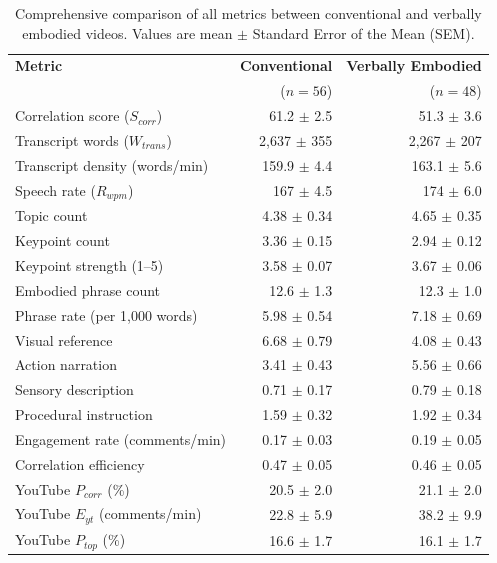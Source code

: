 \documentclass[fleqn,10pt]{JLA_article} %
\begin{document}
\begin{table}[h!]
    \centering
    \caption{Comprehensive comparison of all metrics between conventional and verbally embodied videos. Values are mean $\pm$ Standard Error of the Mean (SEM).}
    \begin{tabular}{l r r}
        \toprule
        \textbf{Metric} & \textbf{Conventional} & \textbf{Verbally Embodied} \\
        & ($n = 56$) & ($n = 48$) \\
        \midrule
        Correlation score ($S_{corr}$) & 61.2 $\pm$ 2.5 & 51.3 $\pm$ 3.6 \\
        Transcript words ($W_{trans}$) & 2{,}637 $\pm$ 355 & 2{,}267 $\pm$ 207 \\
        Transcript density (words/min) & 159.9 $\pm$ 4.4 & 163.1 $\pm$ 5.6 \\
        Speech rate ($R_{wpm}$) & 167 $\pm$ 4.5 & 174 $\pm$ 6.0 \\
        Topic count & 4.38 $\pm$ 0.34 & 4.65 $\pm$ 0.35 \\
        Keypoint count & 3.36 $\pm$ 0.15 & 2.94 $\pm$ 0.12 \\
        Keypoint strength (1--5) & 3.58 $\pm$ 0.07 & 3.67 $\pm$ 0.06 \\
        Embodied phrase count & 12.6 $\pm$ 1.3 & 12.3 $\pm$ 1.0 \\
        Phrase rate (per 1{,}000 words) & 5.98 $\pm$ 0.54 & 7.18 $\pm$ 0.69 \\
        Visual reference & 6.68 $\pm$ 0.79 & 4.08 $\pm$ 0.43 \\
        Action narration & 3.41 $\pm$ 0.43 & 5.56 $\pm$ 0.66 \\
        Sensory description & 0.71 $\pm$ 0.17 & 0.79 $\pm$ 0.18 \\
        Procedural instruction & 1.59 $\pm$ 0.32 & 1.92 $\pm$ 0.34 \\
        Engagement rate (comments/min) & 0.17 $\pm$ 0.03 & 0.19 $\pm$ 0.05 \\
        Correlation efficiency & 0.47 $\pm$ 0.05 & 0.46 $\pm$ 0.05 \\
        YouTube $P_{corr}$ (\%) & 20.5 $\pm$ 2.0 & 21.1 $\pm$ 2.0 \\
        YouTube $E_{yt}$ (comments/min) & 22.8 $\pm$ 5.9 & 38.2 $\pm$ 9.9 \\
        YouTube $P_{top}$ (\%) & 16.6 $\pm$ 1.7 & 16.1 $\pm$ 1.7 \\
        \bottomrule
    \end{tabular}
    \label{tab:full_comparison}
\end{table}
\end{document}
